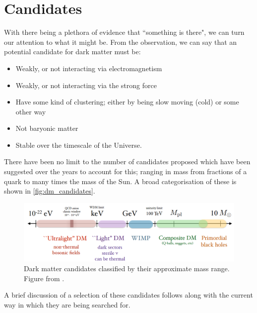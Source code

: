 \section{Candidates}
\par
With there being a plethora of evidence that ``something is there", we can turn our attention to what it might be.
From the observation, we can say that an potential candidate for dark matter must be:
\begin{itemize}
    \item Weakly, or not interacting via electromagnetism 
    \item Weakly, or not interacting via the strong force
    \item Have some kind of clustering; either by being slow moving (cold) or some other way
    \item Not baryonic matter
    \item Stable over the timescale of the Universe.
\end{itemize}
There have been no limit to the number of candidates proposed which have been suggested over the years to account for this; ranging in mass from fractions of a quark to many times the mass of the Sun.
A broad categorisation of these is shown in \autoref{fig:dm_candidates}.
\begin{figure}[!h]
    \centering
    \includegraphics[width=15cm]{Figures/DarkMatterEvidence/dark_matter_candidates.png}
    \caption{Dark matter candidates classified by their approximate mass range. Figure from \cite{dm_figure_candidates_ref}.}
    \label{fig:dm_candidates}
\end{figure}
A brief discussion of a selection of these candidates follows along with the current way in which they are being searched for.

